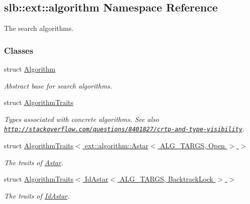 \hypertarget{namespaceslb_1_1ext_1_1algorithm}{}\subsection{slb\+:\+:ext\+:\+:algorithm Namespace Reference}
\label{namespaceslb_1_1ext_1_1algorithm}


The search algorithms.  


\subsubsection*{Classes}
\begin{DoxyCompactItemize}
\item 
struct \hyperlink{structslb_1_1ext_1_1algorithm_1_1Algorithm}{Algorithm}
\begin{DoxyCompactList}\small\item\em Abstract base for search algorithms. \end{DoxyCompactList}\item 
struct \hyperlink{classslb_1_1ext_1_1algorithm_1_1AlgorithmTraits}{Algorithm\+Traits}
\begin{DoxyCompactList}\small\item\em Types associated with concrete algorithms. See also \href{http://stackoverflow.com/questions/8401827/crtp-and-type-visibility}{\tt http\+://stackoverflow.\+com/questions/8401827/crtp-\/and-\/type-\/visibility}. \end{DoxyCompactList}\item 
struct \hyperlink{structslb_1_1ext_1_1algorithm_1_1AlgorithmTraits_3_01ext_1_1algorithm_1_1Astar_3_01ALG__TARGS_00_01Open_01_4_01_4}{Algorithm\+Traits$<$ ext\+::algorithm\+::\+Astar$<$ A\+L\+G\+\_\+\+T\+A\+R\+G\+S, Open $>$ $>$}
\begin{DoxyCompactList}\small\item\em The traits of \hyperlink{structslb_1_1ext_1_1algorithm_1_1Astar}{Astar}. \end{DoxyCompactList}\item 
struct \hyperlink{structslb_1_1ext_1_1algorithm_1_1AlgorithmTraits_3_01IdAstar_3_01ALG__TARGS_00_01BacktrackLock_01_4_01_4}{Algorithm\+Traits$<$ Id\+Astar$<$ A\+L\+G\+\_\+\+T\+A\+R\+G\+S, Backtrack\+Lock $>$ $>$}
\begin{DoxyCompactList}\small\item\em The traits of \hyperlink{structslb_1_1ext_1_1algorithm_1_1IdAstar}{Id\+Astar}. \end{DoxyCompactList}\item 

\end{DoxyCompactItemize}
